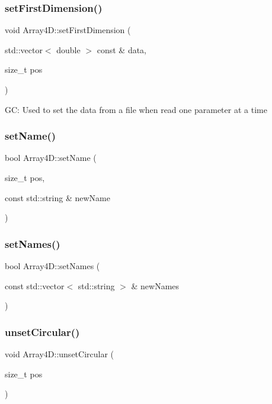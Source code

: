 \subsubsection{\texorpdfstring{set\+First\+Dimension()}{setFirstDimension()}}
{\footnotesize\ttfamily void Array4\+D\+::set\+First\+Dimension (\begin{DoxyParamCaption}\item[{std\+::vector$<$ double $>$ const \&}]{data,  }\item[{size\+\_\+t}]{pos }\end{DoxyParamCaption})}

GC\+: Used to set the data from a file when read one parameter at a time \mbox{\label{class_array4_d_a921401f1e3a471b6b5665d718c636daf}} 
\subsubsection{\texorpdfstring{set\+Name()}{setName()}}
{\footnotesize\ttfamily bool Array4\+D\+::set\+Name (\begin{DoxyParamCaption}\item[{size\+\_\+t}]{pos,  }\item[{const std\+::string \&}]{new\+Name }\end{DoxyParamCaption})}

\mbox{\label{class_array4_d_a8715e92d0a11f73a16ac3d67b7527f86}} 
\subsubsection{\texorpdfstring{set\+Names()}{setNames()}}
{\footnotesize\ttfamily bool Array4\+D\+::set\+Names (\begin{DoxyParamCaption}\item[{const std\+::vector$<$ std\+::string $>$ \&}]{new\+Names }\end{DoxyParamCaption})}

\mbox{\label{class_array4_d_ac6d1282e0d765748c192a72d60274853}} 
\subsubsection{\texorpdfstring{unset\+Circular()}{unsetCircular()}}
{\footnotesize\ttfamily void Array4\+D\+::unset\+Circular (\begin{DoxyParamCaption}\item[{size\+\_\+t}]{pos }\end{DoxyParamCaption})}

